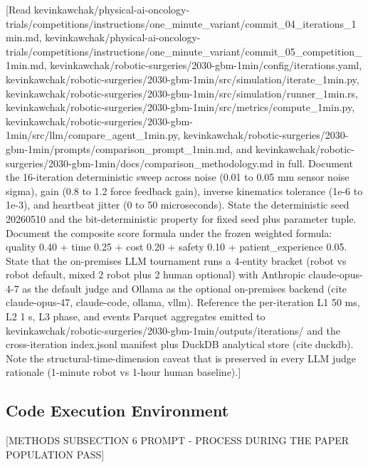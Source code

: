 [Read
kevinkawchak/physical-ai-oncology-trials/competitions/instructions/one_minute_variant/commit_04_iterations_1min.md,
kevinkawchak/physical-ai-oncology-trials/competitions/instructions/one_minute_variant/commit_05_competition_1min.md,
kevinkawchak/robotic-surgeries/2030-gbm-1min/config/iterations.yaml,
kevinkawchak/robotic-surgeries/2030-gbm-1min/src/simulation/iterate_1min.py,
kevinkawchak/robotic-surgeries/2030-gbm-1min/src/simulation/runner_1min.rs,
kevinkawchak/robotic-surgeries/2030-gbm-1min/src/metrics/compute_1min.py,
kevinkawchak/robotic-surgeries/2030-gbm-1min/src/llm/compare_agent_1min.py,
kevinkawchak/robotic-surgeries/2030-gbm-1min/prompts/comparison_prompt_1min.md,
and
kevinkawchak/robotic-surgeries/2030-gbm-1min/docs/comparison_methodology.md
in full. Document the 16-iteration deterministic sweep across noise
(0.01 to 0.05 mm sensor noise sigma), gain (0.8 to 1.2 force feedback
gain), inverse kinematics tolerance (1e-6 to 1e-3), and heartbeat
jitter (0 to 50 microseconds). State the deterministic seed 20260510
and the bit-deterministic property for fixed seed plus parameter
tuple. Document the composite score formula under the frozen weighted
formula: quality 0.40 + time 0.25 + cost 0.20 + safety 0.10 +
patient_experience 0.05. State that the on-premises LLM tournament
runs a 4-entity bracket (robot vs robot default, mixed 2 robot plus
2 human optional) with Anthropic claude-opus-4-7 as the default judge
and Ollama as the optional on-premises backend (cite claude-opus-47,
claude-code, ollama, vllm). Reference the per-iteration L1 50 ms,
L2 1 s, L3 phase, and events Parquet aggregates emitted to
kevinkawchak/robotic-surgeries/2030-gbm-1min/outputs/iterations/
and the cross-iteration index.jsonl manifest plus DuckDB analytical
store (cite duckdb). Note the structural-time-dimension caveat that
is preserved in every LLM judge rationale (1-minute robot vs 1-hour
human baseline).]

\subsection{Code Execution Environment}
\label{sec:methods-execution}

[METHODS SUBSECTION 6 PROMPT - PROCESS DURING THE PAPER POPULATION PASS]

